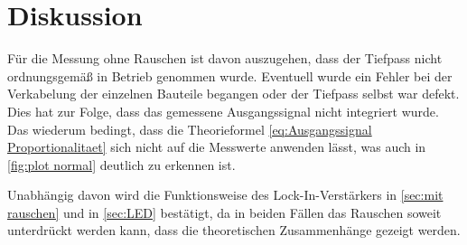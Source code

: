 \section{Diskussion}
\label{sec:Diskussion}

Für die Messung ohne Rauschen ist davon auszugehen, dass der Tiefpass nicht ordnungsgemäß in Betrieb genommen wurde. 
Eventuell wurde ein Fehler bei der Verkabelung der einzelnen Bauteile begangen oder der Tiefpass selbst war defekt.
Dies hat zur Folge, dass das gemessene Ausgangssignal nicht integriert wurde. Das wiederum bedingt, dass die Theorieformel 
\eqref{eq:Ausgangssignal Proportionalitaet} sich nicht auf die Messwerte anwenden lässt, was auch in \autoref{fig:plot normal}
deutlich zu erkennen ist.

Unabhängig davon wird die Funktionsweise des Lock-In-Verstärkers in \ref{sec:mit rauschen} und in \ref{sec:LED} bestätigt, 
da in beiden Fällen das Rauschen soweit unterdrückt werden kann, dass die theoretischen Zusammenhänge gezeigt werden.
